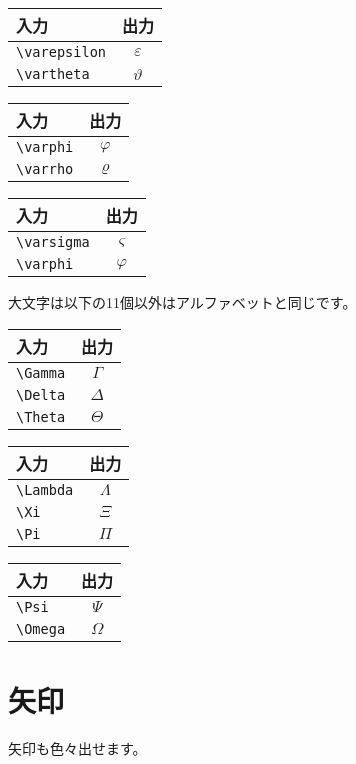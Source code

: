 \documentclass[class=jreport, crop=false, preview=false, dvipdfmx, fleqn]{standalone}
\begin{document}
\begin{tabular}{lc}
入力 & 出力 \\ \hline
\verb|\varepsilon| & $\varepsilon$ \\
\verb|\vartheta| & $\vartheta$ \\
\end{tabular}
\begin{tabular}{lc}
入力 & 出力 \\ \hline
\verb|\varphi| & $\varphi$ \\
\verb|\varrho| & $\varrho$ \\
\end{tabular}
\begin{tabular}{lc}
入力 & 出力 \\ \hline
\verb|\varsigma| & $\varsigma$ \\
\verb|\varphi| & $\varphi$ \\
\end{tabular}

大文字は以下の11個以外はアルファベットと同じです。

\begin{tabular}{lc}
入力 & 出力 \\ \hline
\verb|\Gamma| & $\Gamma$ \\
\verb|\Delta| & $\Delta$ \\
\verb|\Theta| & $\Theta$ \\
\end{tabular}
\begin{tabular}{lc}
入力 & 出力 \\ \hline
\verb|\Lambda| & $\Lambda$ \\
\verb|\Xi| & $\Xi$ \\
\verb|\Pi| & $\Pi$ \\
\end{tabular}
\begin{tabular}{lc}
入力 & 出力 \\ \hline
\verb|\Psi| & $\Psi$ \\
\verb|\Omega| & $\Omega$ \\
\end{tabular}



\section{矢印}
矢印も色々出せます。
\end{document}

